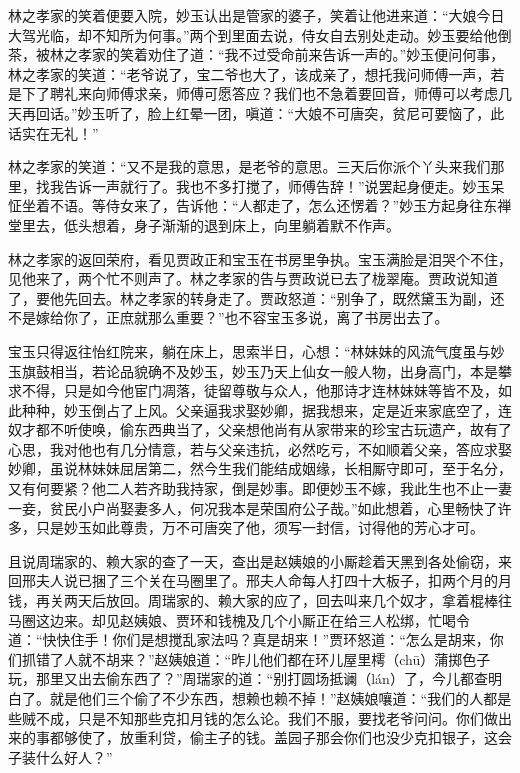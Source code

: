 \documentclass[12pt,oneside]{book}
\begin{document}
林之孝家的笑着便要入院，妙玉认出是管家的婆子，笑着让他进来道：“大娘今日大驾光临，却不知所为何事。”两个到里面去说，侍女自去别处走动。妙玉要给他倒茶，被林之孝家的笑着劝住了道：“我不过受命前来告诉一声的。”妙玉便问何事，林之孝家的笑道：“老爷说了，宝二爷也大了，该成亲了，想托我问师傅一声，若是下了聘礼来向师傅求亲，师傅可愿答应？我们也不急着要回音，师傅可以考虑几天再回话。”妙玉听了，脸上红晕一团，嗔道：“大娘不可唐突，贫尼可要恼了，此话实在无礼！”

林之孝家的笑道：“又不是我的意思，是老爷的意思。三天后你派个丫头来我们那里，找我告诉一声就行了。我也不多打搅了，师傅告辞！”说罢起身便走。妙玉呆怔坐着不语。等侍女来了，告诉他：“人都走了，怎么还愣着？”妙玉方起身往东禅堂里去，低头想着，身子渐渐的退到床上，向里躺着默不作声。

林之孝家的返回荣府，看见贾政正和宝玉在书房里争执。宝玉满脸是泪哭个不住，见他来了，两个忙不则声了。林之孝家的告与贾政说已去了栊翠庵。贾政说知道了，要他先回去。林之孝家的转身走了。贾政怒道：“别争了，既然黛玉为副，还不是嫁给你了，正庶就那么重要？”也不容宝玉多说，离了书房出去了。

宝玉只得返往怡红院来，躺在床上，思索半日，心想：“林妹妹的风流气度虽与妙玉旗鼓相当，若论品貌确不及妙玉，妙玉乃天上仙女一般人物，出身高门，本是攀求不得，只是如今他宦门凋落，徒留尊敬与众人，他那诗才连林妹妹等皆不及，如此种种，妙玉倒占了上风。父亲逼我求娶妙卿，据我想来，定是近来家底空了，连奴才都不听使唤，偷东西典当了，父亲想他尚有从家带来的珍宝古玩遗产，故有了心思，我对他也有几分情意，若与父亲违抗，必然吃亏，不如顺着父亲，答应求娶妙卿，虽说林妹妹屈居第二，然今生我们能结成姻缘，长相厮守即可，至于名分，又有何要紧？他二人若齐助我持家，倒是妙事。即便妙玉不嫁，我此生也不止一妻一妾，贫民小户尚娶妻多人，何况我本是荣国府公子哉。”如此想着，心里畅快了许多，只是妙玉如此尊贵，万不可唐突了他，须写一封信，讨得他的芳心才可。

且说周瑞家的、赖大家的查了一天，查出是赵姨娘的小厮趁着天黑到各处偷窃，来回邢夫人说已捆了三个关在马圈里了。邢夫人命每人打四十大板子，扣两个月的月钱，再关两天后放回。周瑞家的、赖大家的应了，回去叫来几个奴才，拿着棍棒往马圈这边来。却见赵姨娘、贾环和钱槐及几个小厮正在给三人松绑，忙喝令道：“快快住手！你们是想搅乱家法吗？真是胡来！”贾环怒道：“怎么是胡来，你们抓错了人就不胡来？”赵姨娘道：“昨儿他们都在环儿屋里樗（chū）蒲掷色子玩，那里又出去偷东西了？”周瑞家的道：“别打圆场抵谰（lán）了，今儿都查明白了。就是他们三个偷了不少东西，想赖也赖不掉！”赵姨娘嚷道：“我们的人都是些贼不成，只是不知那些克扣月钱的怎么论。我们不服，要找老爷问问。你们做出来的事都够使了，放重利贷，偷主子的钱。盖园子那会你们也没少克扣银子，这会子装什么好人？”
\end{document}
